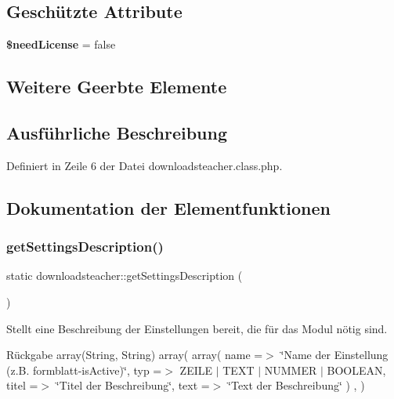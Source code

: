 \subsection*{Geschützte Attribute}
\begin{DoxyCompactItemize}
\item 
\mbox{\label{classdownloadsteacher_a30cb16942adecb25ec7faef24f61e5e3}} 
{\bfseries \$need\+License} = false
\end{DoxyCompactItemize}
\subsection*{Weitere Geerbte Elemente}


\subsection{Ausführliche Beschreibung}


Definiert in Zeile 6 der Datei downloadsteacher.\+class.\+php.



\subsection{Dokumentation der Elementfunktionen}
\mbox{\label{classdownloadsteacher_a95714429550efcfac8a294c1341de6e9}} 
\subsubsection{\texorpdfstring{get\+Settings\+Description()}{getSettingsDescription()}}
{\footnotesize\ttfamily static downloadsteacher\+::get\+Settings\+Description (\begin{DoxyParamCaption}{ }\end{DoxyParamCaption})\hspace{0.3cm}{\ttfamily [static]}}

Stellt eine Beschreibung der Einstellungen bereit, die für das Modul nötig sind. \begin{DoxyReturn}{Rückgabe}
array(\+String, String) array( array( \textquotesingle{}name\textquotesingle{} =$>$ \char`\"{}\+Name der Einstellung (z.\+B. formblatt-\/is\+Active)\char`\"{}, \textquotesingle{}typ\textquotesingle{} =$>$ Z\+E\+I\+LE $\vert$ T\+E\+XT $\vert$ N\+U\+M\+M\+ER $\vert$ B\+O\+O\+L\+E\+AN, \textquotesingle{}titel\textquotesingle{} =$>$ \char`\"{}\+Titel der Beschreibung\char`\"{}, \textquotesingle{}text\textquotesingle{} =$>$ \char`\"{}\+Text der Beschreibung\char`\"{} ) , ) 
\end{DoxyReturn}


